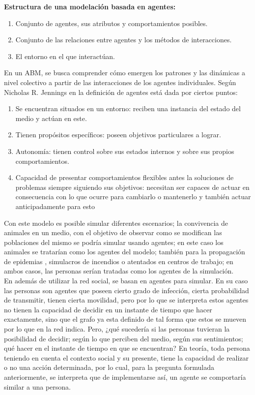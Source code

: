 \textbf{Estructura de una modelación basada en agentes:}\\
\begin{enumerate}
    \item Conjunto de agentes, sus atributos y comportamientos posibles.
    \item Conjunto de las relaciones entre agentes y los métodos de interacciones.
    \item El entorno en el que interactúan.
\end{enumerate}


En un ABM, se busca comprender cómo emergen los patrones y las dinámicas a nivel colectivo a partir de las interacciones 
de los agentes individuales. Según Nicholas R. Jennings en \autocite{Jennings2000} la definición de agentes está dada 
por ciertos puntos:\\
\begin{enumerate}
    \item Se encuentran situados en un entorno: reciben una instancia del estado del medio y actúan en este.
    \item Tienen propósitos específicos: poseen objetivos particulares a lograr.
    \item Autonomía: tienen control sobre sus estados internos y sobre sus propios comportamientos.
    \item Capacidad de presentar comportamientos flexibles antes la soluciones de problemas siempre siguiendo sus objetivos: necesitan ser capaces de actuar en consecuencia con lo que ocurre para cambiarlo o mantenerlo y también actuar anticipadamente para esto
\end{enumerate}

Con este modelo es posible simular diferentes escenarios; la convivencia de animales en un medio, con el 
objetivo de observar como se modifican las poblaciones del mismo se podría simular usando agentes; en este 
caso los animales se tratarían como los agentes del modelo; también para la propagación de epidemias \autocite{Bagni2002}, 
simulacros de incendios o atentados en centros de trabajo; en ambos casos, las personas serían tratadas como los agentes 
de la simulación.\\ 

En \autocite{Bissett2021} 
además de utilizar la red social, se basan en agentes para simular. En su caso las personas son agentes que 
poseen cierto grado de infección, cierta probabilidad de transmitir, tienen cierta movilidad, pero por lo 
que se interpreta estos agentes no tienen la capacidad de decidir en un instante de tiempo que hacer exactamente, 
sino que el grafo ya esta definido  de tal forma que estos se mueven por lo que en la red indica. Pero, ¿qué 
sucedería si las personas tuvieran la posibilidad de decidir; según lo que perciben del medio, según sus sentimientos; 
qué hacer en el instante de tiempo en que se encuentran? En teoría, toda persona teniendo en cuenta el 
contexto social y su presente, tiene la capacidad de realizar o no una acción determinada, por lo cual, para la pregunta 
formulada anteriormente, se interpreta que de implementarse así, un agente se comportaría similar a una persona.\\ 


